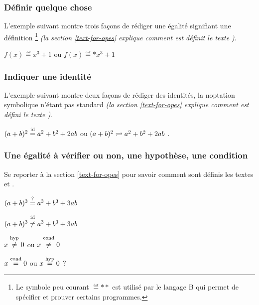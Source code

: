 \documentclass[12pt,a4paper]{article}
\theoremstyle{definition}
\begin{document}
\subsubsection{Définir quelque chose}

L'exemple suivant montre trois façons de rédiger une égalité signifiant une définition
\footnote{
	Le symbole peu courant $\eqdef**$ est utilisé par le langage B qui permet de spécifier et prouver certains programmes.
}
\emph{(la section \ref{text-for-opes} explique comment est définit le texte \emph{\og \textopdef \fg})}.

\begin{latexex}
$f(x) \eqdef x^3 + 1$ ou
$f(x) \eqdef* x^3 + 1$
\end{latexex}




\subsubsection{Indiquer une identité}

L'exemple suivant montre deux façons de rédiger des identités, la noptation symbolique n'étant pas standard \emph{(la section \ref{text-for-opes} explique comment est défini le texte \emph{\og \textopid \fg})}.

\begin{latexex}
$(a + b)^2 \eqid a^2 + b^2 + 2 a b$ ou
$(a + b)^2 \eqid* a^2 + b^2 + 2 a b$ .
\end{latexex}




\subsubsection{Une égalité à vérifier ou non, une hypothèse, une condition}

Se reporter à la section \ref{text-for-opes} pour savoir comment sont définis les textes \emph{\og \textopcond \fg} et \emph{\og \textophyp \fg}.

\begin{latexex}
$(a + b)^3 \eqtest a^3 + b^3 + 3 a b$

$(a + b)^3 \neqid a^3 + b^3 + 3 a b$

$x \neqhyp 0$ ou $x \neqcond 0$

$x \eqcond 0$ ou $x \eqhyp 0$ ?
\end{latexex}


\end{document}
